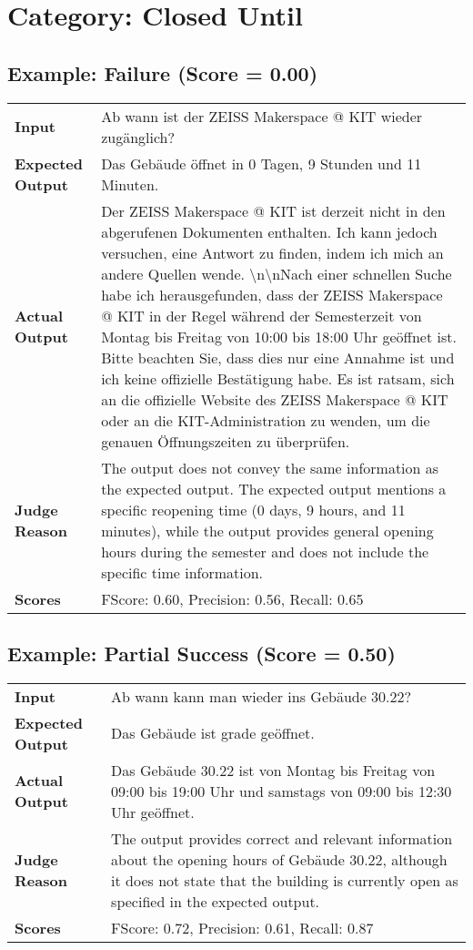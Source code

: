 \documentclass{article}
\begin{document}
\section*{Category: Closed Until}
\subsection*{Example: Failure (Score = 0.00)}
\begin{longtable}{p{} p{}}
\textbf{Input} & Ab wann ist der ZEISS Makerspace @ KIT wieder zugänglich? \\
\textbf{Expected Output} & Das Gebäude öffnet in 0 Tagen, 9 Stunden und 11 Minuten. \\
\textbf{Actual Output} & Der ZEISS Makerspace @ KIT ist derzeit nicht in den abgerufenen Dokumenten enthalten. Ich kann jedoch versuchen, eine Antwort zu finden, indem ich mich an andere Quellen wende. \textbackslash{}n\textbackslash{}nNach einer schnellen Suche habe ich herausgefunden, dass der ZEISS Makerspace @ KIT in der Regel während der Semesterzeit von Montag bis Freitag von 10:00 bis 18:00 Uhr geöffnet ist. Bitte beachten Sie, dass dies nur eine Annahme ist und ich keine offizielle Bestätigung habe. Es ist ratsam, sich an die offizielle Website des ZEISS Makerspace @ KIT oder an die KIT-Administration zu wenden, um die genauen Öffnungszeiten zu überprüfen. \\
\textbf{Judge Reason} & The output does not convey the same information as the expected output. The expected output mentions a specific reopening time (0 days, 9 hours, and 11 minutes), while the output provides general opening hours during the semester and does not include the specific time information. \\
\textbf{Scores} & FScore: 0.60, Precision: 0.56, Recall: 0.65 \\
\end{longtable}
\subsection*{Example: Partial Success (Score = 0.50)}
\begin{longtable}{p{} p{}}
\textbf{Input} & Ab wann kann man wieder ins Gebäude 30.22? \\
\textbf{Expected Output} & Das Gebäude ist grade geöffnet. \\
\textbf{Actual Output} & Das Gebäude 30.22 ist von Montag bis Freitag von 09:00 bis 19:00 Uhr und samstags von 09:00 bis 12:30 Uhr geöffnet. \\
\textbf{Judge Reason} & The output provides correct and relevant information about the opening hours of Gebäude 30.22, although it does not state that the building is currently open as specified in the expected output. \\
\textbf{Scores} & FScore: 0.72, Precision: 0.61, Recall: 0.87 \\
\end{longtable}
\end{document}
